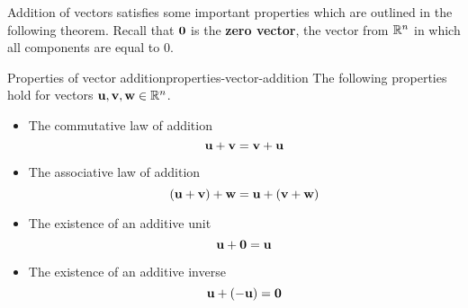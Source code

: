 Addition of vectors satisfies some important properties which are
outlined in the following theorem.  Recall that $\mbox{\bf 0}$ is the
\textbf{zero vector}, the vector
from $\mathbb{R}^{n}$ in which all components are equal to $0$.

\begin{theorem}{Properties of vector addition}{properties-vector-addition}
The following properties hold for vectors $\mbox{\bf u},\mbox{\bf v}, \mbox{\bf w} \in \mathbb{R}^{n}$.
\begin{itemize}
\item The commutative law of addition
\begin{equation*}
\mbox{\bf u}+\mbox{\bf v}=\mbox{\bf v}+\mbox{\bf u}
\end{equation*}
\item The associative law of addition
\begin{equation*}
\left(\mbox{\bf u}+\mbox{\bf v}\right) +\mbox{\bf w}=\mbox{\bf u}+\left(\mbox{\bf v}+\mbox{\bf w}\right)
\end{equation*}
\item The existence of an additive unit
\begin{equation*}
\mbox{\bf u}+\mbox{\bf 0}=\mbox{\bf u}
\end{equation*}
\item The existence of an additive inverse
\begin{equation*}
\mbox{\bf u}+\left(-\mbox{\bf u}\right) =\mbox{\bf 0}  
\end{equation*}
\end{itemize}
\end{theorem}

